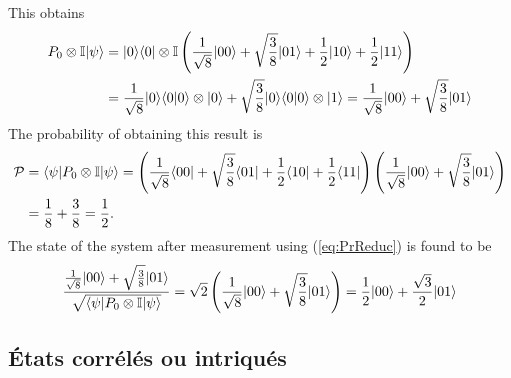 \begin{footnotesize}
\begin{solution}
\begin{enumerate}
This obtains
\begin{equation}
 \begin{split}
P_0\otimes\mathbb{I}\vert\psi\rangle & =\vert0\rangle\langle0\vert\otimes\mathbb{I}\left(\frac{1}{
\sqrt{8}}\vert00\rangle+\sqrt{\frac{3}{8}}\vert01\rangle+\frac{1}{2}\vert10\rangle+\frac{1}{2}\vert11\rangle\right)\\
 & = \frac{1}{\sqrt{8}}\vert0\rangle\langle0\vert0\rangle\otimes\vert0\rangle+\sqrt{\frac{3}{8}}
\vert0\rangle\langle0\vert0\rangle\otimes\vert1\rangle=
\frac{1}{\sqrt{8}}\vert00\rangle+\sqrt{\frac{3}{8}}\vert01\rangle
\end{split}
\end{equation}
The probability of obtaining this result is
\begin{equation}
 \begin{split}
\mathcal{P} & =\langle\psi\vert P_0\otimes\mathbb{I}\vert\psi\rangle=
\left(\frac{1}{\sqrt{8}}\langle00\vert+\sqrt{\frac{3}{8}}\langle01\vert+\frac{1}{2}\langle10\vert
+\frac{1}{2}\langle11\vert\right)\left(\frac{1}{\sqrt{8}}\vert00\rangle+\sqrt{\frac{3}{8}}
\vert01\rangle \right) \\
& = \frac{1}{8}+\frac{3}{8}=\frac{1}{2}.
\end{split}
\end{equation}
The state of the system after measurement using (\ref{eq:PrReduc}) is found to
be
\begin{equation}
 \frac{\frac{1}{\sqrt{8}}\vert00\rangle+\sqrt{\frac{3}{8}}\vert01\rangle}{\sqrt{\langle\psi\vert
P_0\otimes\mathbb{I}\vert\psi\rangle}}=\sqrt{2}\left(
\frac{1}{\sqrt{8}}\vert00\rangle+\sqrt{\frac{3}{8}}\vert01\rangle\right)=
\frac{1}{2}\vert00\rangle+\frac{\sqrt{3}}{2}\vert01\rangle
\end{equation}
\end{enumerate}

\end{solution}
\end{footnotesize}

\subsection{États corrélés ou intriqués}


